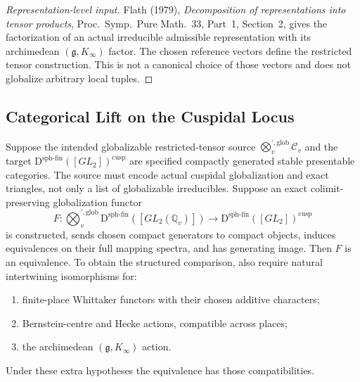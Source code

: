 \begin{proof}[Representation-level input]
Flath (1979), \emph{Decomposition of representations into tensor
products}, Proc.\ Symp.\ Pure Math.~33, Part~1, Section~2, gives the
factorization of an actual irreducible admissible representation with
its archimedean $(\mathfrak g,K_\infty)$ factor. The chosen reference
vectors define the restricted tensor construction. This is not a
canonical choice of those vectors and does not globalize arbitrary
local tuples.
\end{proof}

\subsection{Categorical Lift on the Cuspidal Locus}

\begin{theorem}
\label{v4-arith:w5-e:thm:LACD-cuspidal}
Suppose the intended globalizable restricted-tensor source
$\bigotimes_v^{\prime,\mathrm{glob}}\mathcal C_v$ and the target
$\mathrm D^{\mathrm{sph\text{-}fin}}([GL_2])^{\mathrm{cusp}}$
are specified compactly generated stable presentable categories.
The source must encode actual cuspidal globalization and exact
triangles, not only a list of globalizable irreducibles. Suppose an
exact colimit-preserving globalization functor
\[
 F:\bigotimes_v^{\prime,\mathrm{glob}}
 \mathrm D^{\mathrm{sph\text{-}fin}}([GL_2(\mathbb Q_v)])
 \longrightarrow\mathrm D^{\mathrm{sph\text{-}fin}}([GL_2])^{\mathrm{cusp}}
\]
is constructed, sends chosen compact generators to compact objects,
induces equivalences on their full mapping spectra, and has generating
image. Then $F$ is an equivalence. To obtain the structured
comparison, also require natural intertwining isomorphisms for:
\begin{enumerate}
\item finite-place Whittaker functors with their chosen additive characters;
\item Bernstein-centre and Hecke actions, compatible across places;
\item the archimedean $(\mathfrak g,K_\infty)$ action.
\end{enumerate}
Under these extra hypotheses the equivalence has those compatibilities.
\end{theorem}
